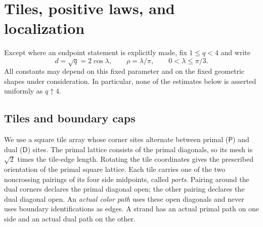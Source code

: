 \section{Tiles, positive laws, and localization}\label{sec:preliminaries}

Except where an endpoint statement is explicitly made, fix $1\le q<4$ and write
\begin{equation}\label{prelim:parameters}
 d=\sqrt q=2\cos\lambda,\qquad \rho=\lambda/\pi,
 \qquad 0<\lambda\le\pi/3.
\end{equation}
All constants may depend on this fixed parameter and on the fixed geometric
shapes under consideration. In particular, none of the estimates below is
asserted uniformly as $q\uparrow4$.

\subsection{Tiles and boundary caps}

We use a square tile array whose corner sites alternate between primal
($\mathsf P$) and dual ($\mathsf D$) sites. The primal lattice consists of the
primal diagonals, so its mesh is $\sqrt2$ times the tile-edge length. Rotating
the tile coordinates gives the prescribed orientation of the primal square
lattice. Each tile carries one of the two noncrossing pairings of its four
side midpoints, called \emph{ports}. Pairing around the dual corners declares
the primal diagonal open; the other pairing declares the dual diagonal open.
An \emph{actual color path} uses these open diagonals and never uses boundary
identifications as edges. A strand has an actual primal path on one side and
an actual dual path on the other.


